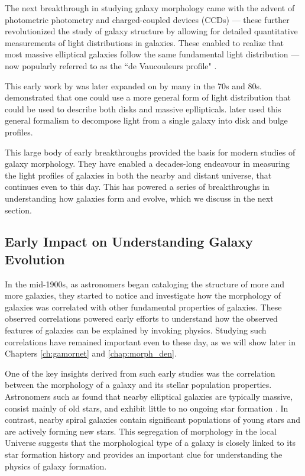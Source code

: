 The next breakthrough in studying galaxy morphology came with the advent of photometric photometry and charged-coupled devices (CCDs) --- these further revolutionized the study of galaxy structure by allowing for detailed quantitative measurements of light distributions in galaxies. These enabled \citeauthor{de_vac_48} to realize that most massive elliptical galaxies follow the same fundamental light distribution --- now popularly referred to as the ``de Vaucouleurs profile" \citep{de_vac_48}. 

This early work by \citeauthor{de_vac_48} was later expanded on by many in the 70s and 80s. \citet{sersic_63} demonstrated that one could use a more general form of light distribution that could be used to describe both disks and massive epllipticals. \citet{kormendy_77} later used this general formalism to decompose light from a single galaxy into disk and bulge profiles. 

This large body of early breakthroughs provided the basis for modern studies of galaxy morphology. They have enabled a decades-long endeavour in measuring the light profiles of galaxies in both the nearby and distant universe, that continues even to this day. This has powered a series of breakthroughs in understanding how galaxies form and evolve, which we discuss in the next section. 

\subsection{Early Impact on Understanding Galaxy Evolution} \label{sec_intro:gal_evo}
In the mid-1900s, as astronomers began cataloging the structure of more and more galaxies, they started to notice and investigate how the morphology of galaxies was correlated with other fundamental properties of galaxies. These observed correlations powered early efforts to understand how the observed features of galaxies can be explained by invoking physics. Studying such correlations have remained important even to these day, as we will show later in Chapters \ref{ch:gamornet} and \ref{chap:morph_den}.

One of the key insights derived from such early studies was the correlation between the morphology of a galaxy and its stellar population properties. Astronomers such as \citeauthor{holmberg_58} found that nearby elliptical galaxies are typically massive, consist mainly of old stars, and exhibit little to no ongoing star formation \citep{holmberg_58}. In contrast, nearby spiral galaxies contain significant populations of young stars and are actively forming new stars. This segregation of morphology in the local Universe  suggests that the morphological type of a galaxy is closely linked to its star formation history and provides an important clue for understanding the physics of galaxy formation.

